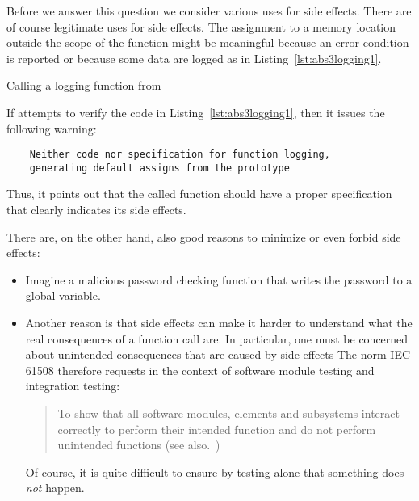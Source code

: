 \FloatBarrier

Before we answer this question we consider various uses for side effects.
There are of course legitimate uses for side effects.
The assignment to a memory location outside the scope of the function
might be meaningful because an error condition is reported or because
some data are logged as in Listing~\ref{lst:abs3logging1}.

\begin{listing}[hbt]
\begin{minipage}{\textwidth}

\end{minipage}
\caption{\label{lst:abs3logging1} Calling a logging function from }
\end{listing}

If \framacwp attempts to verify the code in Listing~\ref{lst:abs3logging1},
then it issues the following warning:
%
\begin{small}
\begin{verbatim}
    Neither code nor specification for function logging,
    generating default assigns from the prototype
\end{verbatim}
\end{small}
%
Thus, it points out that the called function  should have a proper
specification that clearly indicates its side effects.

There are, on the other hand, also good reasons to minimize or even forbid side 
effects:

\begin{itemize}
\item
Imagine a malicious password checking function that writes the password to
a global variable.

\item
Another reason is that side effects can make it harder to understand what 
the real consequences of a function call are.
In particular, one must be concerned about unintended consequences that
are caused by side effects
The norm IEC 61508 therefore requests in the context of software module testing
and integration testing:

\begin{quote}
To show that all software modules,
elements and subsystems interact correctly
to perform their intended function and do not perform unintended functions
(see also.~\cite[\S 7.4.7.2,\S 7.7.2.9]{IEC-61508-3})
\end{quote}

Of course, it is quite difficult to ensure by testing alone that something does \emph{not} happen.
\end{itemize}


